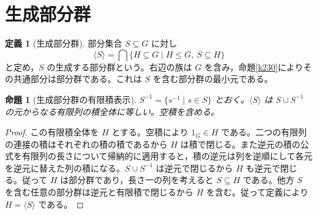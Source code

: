 \documentclass[a5paper,10pt,dvipdfmx]{jsarticle}
\theoremstyle{definition}
\newtheorem{defn}[ruledef]{定義}
\theoremstyle{plain}
\newtheorem{prop}[ruledef]{命題}
\begin{document}
\section{生成部分群}
\begin{defn}[生成部分群]\label{k231}
部分集合 $S\subseteq G$ に対し
\[
 \langle S\rangle=\bigcap\{H\subseteq G\mid
 H\leq G,\ S\subseteq H\}
\]
と定め，$S$ の生成する部分群という。右辺の族は $G$ を含み，命題\ref{k230}によりその共通部分は部分群である。これは $S$ を含む部分群の最小元である。
\end{defn}
\begin{prop}[生成部分群の有限積表示]\label{k232}
$S^{-1}=\{s^{-1}\mid s\in S\}$ とおく。$\langle S\rangle$ は $S\cup S^{-1}$ の元からなる有限列の積全体に等しい。空積を含める。
\end{prop}
\begin{proof}
この有限積全体を $H$ とする。空積により $1_G\in H$ である。二つの有限列の連接の積はそれぞれの積の積であるから $H$ は積で閉じる。また逆元の積の公式を有限列の長さについて帰納的に適用すると，積の逆元は列を逆順にして各元を逆元に替えた列の積になる。$S\cup S^{-1}$ は逆元で閉じるから $H$ も逆元で閉じる。従って $H$ は部分群であり，長さ一の列を考えると $S\subseteq H$ である。他方 $S$ を含む任意の部分群は逆元と有限積で閉じるから $H$ を含む。従って定義により $H=\langle S\rangle$ である。
\end{proof}

\end{document}
